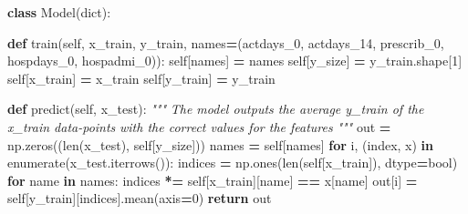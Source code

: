 \documentclass[
]{article}
\newenvironment{Shaded}{\begin{snugshade}}{\end{snugshade}}
\newcommand{\BuiltInTok}[1]{#1}
\newcommand{\CommentTok}[1]{\textcolor[rgb]{0.56,0.35,0.01}{\textit{#1}}}
\newcommand{\ControlFlowTok}[1]{\textcolor[rgb]{0.13,0.29,0.53}{\textbf{#1}}}
\newcommand{\DecValTok}[1]{\textcolor[rgb]{0.00,0.00,0.81}{#1}}
\newcommand{\KeywordTok}[1]{\textcolor[rgb]{0.13,0.29,0.53}{\textbf{#1}}}
\newcommand{\NormalTok}[1]{#1}
\newcommand{\OperatorTok}[1]{\textcolor[rgb]{0.81,0.36,0.00}{\textbf{#1}}}
\newcommand{\StringTok}[1]{\textcolor[rgb]{0.31,0.60,0.02}{#1}}
\newcommand{\VariableTok}[1]{\textcolor[rgb]{0.00,0.00,0.00}{#1}}
\begin{document}
\begin{Shaded}
\begin{Highlighting}[]

\KeywordTok{class}\NormalTok{ Model(}\BuiltInTok{dict}\NormalTok{):}

    \KeywordTok{def}\NormalTok{ train(}\VariableTok{self}\NormalTok{, x\_train, y\_train, }
\NormalTok{              names}\OperatorTok{=}\NormalTok{(}\StringTok{\textquotesingle{}actdays\_0\textquotesingle{}}\NormalTok{, }\StringTok{\textquotesingle{}actdays\_14\textquotesingle{}}\NormalTok{, }
                     \StringTok{\textquotesingle{}prescrib\_0\textquotesingle{}}\NormalTok{, }\StringTok{\textquotesingle{}hospdays\_0\textquotesingle{}}\NormalTok{, }\StringTok{\textquotesingle{}hospadmi\_0\textquotesingle{}}\NormalTok{)):}
        \VariableTok{self}\NormalTok{[}\StringTok{\textquotesingle{}names\textquotesingle{}}\NormalTok{] }\OperatorTok{=}\NormalTok{ names}
        \VariableTok{self}\NormalTok{[}\StringTok{\textquotesingle{}y\_size\textquotesingle{}}\NormalTok{] }\OperatorTok{=}\NormalTok{ y\_train.shape[}\DecValTok{1}\NormalTok{]}
        \VariableTok{self}\NormalTok{[}\StringTok{\textquotesingle{}x\_train\textquotesingle{}}\NormalTok{] }\OperatorTok{=}\NormalTok{ x\_train}
        \VariableTok{self}\NormalTok{[}\StringTok{\textquotesingle{}y\_train\textquotesingle{}}\NormalTok{] }\OperatorTok{=}\NormalTok{ y\_train}

    \KeywordTok{def}\NormalTok{ predict(}\VariableTok{self}\NormalTok{, x\_test):}
        \CommentTok{"""}
\CommentTok{        The model outputs the average y\_train of the x\_train data{-}points}
\CommentTok{        with the correct values for the features}
\CommentTok{        """}
\NormalTok{        out }\OperatorTok{=}\NormalTok{ np.zeros((}\BuiltInTok{len}\NormalTok{(x\_test), }\VariableTok{self}\NormalTok{[}\StringTok{\textquotesingle{}y\_size\textquotesingle{}}\NormalTok{]))}
\NormalTok{        names }\OperatorTok{=} \VariableTok{self}\NormalTok{[}\StringTok{\textquotesingle{}names\textquotesingle{}}\NormalTok{]}
        \ControlFlowTok{for}\NormalTok{ i, (index, x) }\KeywordTok{in} \BuiltInTok{enumerate}\NormalTok{(x\_test.iterrows()):}
\NormalTok{            indices }\OperatorTok{=}\NormalTok{ np.ones(}\BuiltInTok{len}\NormalTok{(}\VariableTok{self}\NormalTok{[}\StringTok{\textquotesingle{}x\_train\textquotesingle{}}\NormalTok{]), dtype}\OperatorTok{=}\BuiltInTok{bool}\NormalTok{)}
            \ControlFlowTok{for}\NormalTok{ name }\KeywordTok{in}\NormalTok{ names:}
\NormalTok{                indices }\OperatorTok{*=} \VariableTok{self}\NormalTok{[}\StringTok{\textquotesingle{}x\_train\textquotesingle{}}\NormalTok{][name] }\OperatorTok{==}\NormalTok{ x[name]}
\NormalTok{            out[i] }\OperatorTok{=} \VariableTok{self}\NormalTok{[}\StringTok{\textquotesingle{}y\_train\textquotesingle{}}\NormalTok{][indices].mean(axis}\OperatorTok{=}\DecValTok{0}\NormalTok{)}
        \ControlFlowTok{return}\NormalTok{ out}



\end{Highlighting}
\end{Shaded}
\end{document}
